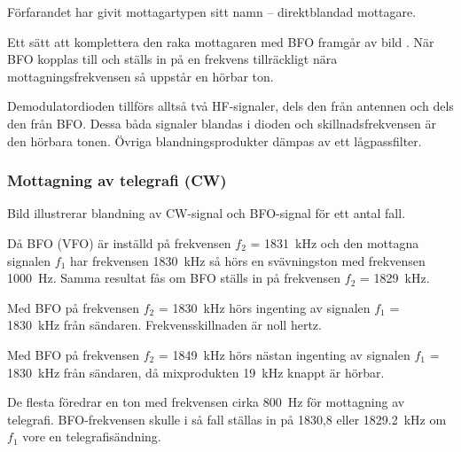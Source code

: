 Förfarandet har givit mottagartypen sitt namn -- direktblandad mottagare.

Ett sätt att komplettera den raka mottagaren med BFO framgår av bild
.
När BFO kopplas till och ställs in på en frekvens tillräckligt
nära mottagningsfrekvensen så uppstår en hörbar ton.

Demodulatordioden tillförs alltså två HF-signaler, dels den från
antennen och dels den från BFO.
Dessa båda signaler blandas i dioden och skillnadsfrekvensen är den hörbara
tonen.
Övriga blandningsprodukter dämpas av ett lågpassfilter.



\newpage
\subsubsection{Mottagning av telegrafi (CW)}

Bild  illustrerar blandning av CW-signal och BFO-signal
för ett antal fall.

Då BFO (VFO) är inställd på frekvensen \(f_2\) = \SI{1831}{\kilo\hertz} och den
mottagna signalen \(f_1\) har frekvensen \SI{1830}{\kilo\hertz} så hörs en
svävningston med frekvensen \SI{1000}{\hertz}.
Samma resultat fås om BFO ställs in på frekvensen \(f_2\) =
\SI{1829}{\kilo\hertz}.

Med BFO på frekvensen \(f_2\) = \SI{1830}{\kilo\hertz} hörs ingenting av
signalen \(f_1\) = \SI{1830}{\kilo\hertz} från sändaren.
Frekvensskillnaden är noll hertz.

Med BFO på frekvensen \(f_2\) = \SI{1849}{\kilo\hertz} hörs nästan ingenting av
signalen \(f_1\) = \SI{1830}{\kilo\hertz} från sändaren, då mixprodukten
\SI{19}{\kilo\hertz} knappt är hörbar.

De flesta föredrar en ton med frekvensen cirka \SI{800}{\hertz} för mottagning
av telegrafi.
BFO-frekvensen skulle i så fall ställas in på 1830,8 eller
\SI{1829,2}{\kilo\hertz} om \(f_1\) vore en telegrafisändning.



